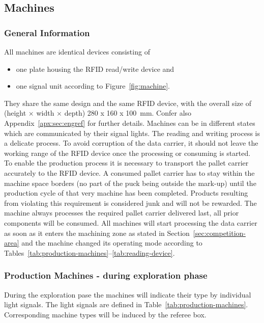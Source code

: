 \documentclass[12pt,twoside]{article}
\begin{document}
\subsection{Machines}
\label{sec:machines}

\subsubsection{General Information}


All machines are identical devices consisting of 
\begin{itemize}
\item one plate housing the RFID read/write device and
\item one signal unit according to Figure~\ref{fig:machine}.
\end{itemize}

They share the same design and the same RFID device, with the overall
size of (height $\times$ width $\times$ depth) \SI{280 x 160 x
100}{\milli\metre}. Confer also Appendix~\ref{apx:sec:engref} for further
details. Machines can be in different states which are communicated by their
signal lights. The reading and writing process is a delicate process. To avoid
corruption of the data carrier, it should not leave the working range of the
RFID device once the processing or consuming is started. To enable the
production process it is necessary to transport the pallet carrier accurately to
the RFID device. A consumed pallet carrier has to stay within the machine space
borders (no part of the puck being outside the mark-up) until the production
cycle of that very machine has been completed. Products resulting from violating
this requirement is considered junk and will not be rewarded. The machine always
processes the required pallet carrier delivered last, all prior components will
be consumed. All machines will start processing the data carrier as soon as it
enters the machining zone as stated in Section~\ref{sec:competition-area} and
the machine changed its operating mode according to
Tables~\ref{tab:production-machines}--\ref{tab:reading-device}.

\subsubsection{Production Machines - during exploration phase}
\label{sec:production-machines-exp}
 During the exploration pase the
machines will indicate their type by individual light signals. The
light signals are defined in Table~\ref{tab:production-machines}.
Corresponding machine types will be induced by the referee box.
\end{document}
